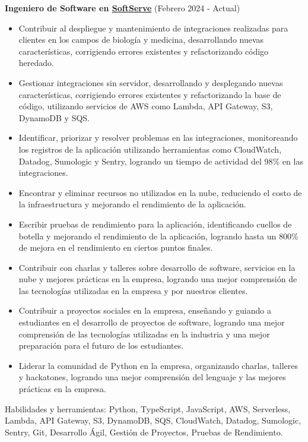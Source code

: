   \vspace*{0.2cm}
  \textbf{Ingeniero de Software en \href{https://www.softserveinc.com/en-us}{SoftServe}} (Febrero 2024 - Actual)
  \hfill
  \vspace*{0.2cm}
  \begin{minipage}{\linewidth}
    \begin{itemize}[noitemsep]
      \item Contribuir al despliegue y mantenimiento de integraciones realizadas para clientes en los campos de biología y medicina, desarrollando nuevas características, corrigiendo errores existentes y refactorizando código heredado.
      \item Gestionar integraciones sin servidor, desarrollando y desplegando nuevas características, corrigiendo errores existentes y refactorizando la base de código, utilizando servicios de AWS como Lambda, API Gateway, S3, DynamoDB y SQS.
      \item Identificar, priorizar y resolver problemas en las integraciones, monitoreando los registros de la aplicación utilizando herramientas como CloudWatch, Datadog, Sumologic y Sentry, logrando un tiempo de actividad del 98\% en las integraciones.
      \item Encontrar y eliminar recursos no utilizados en la nube, reduciendo el costo de la infraestructura y mejorando el rendimiento de la aplicación.
      \item Escribir pruebas de rendimiento para la aplicación, identificando cuellos de botella y mejorando el rendimiento de la aplicación, logrando hasta un 800\% de mejora en el rendimiento en ciertos puntos finales.
      \item Contribuir con charlas y talleres sobre desarrollo de software, servicios en la nube y mejores prácticas en la empresa, logrando una mejor comprensión de las tecnologías utilizadas en la empresa y por nuestros clientes.
      \item Contribuir a proyectos sociales en la empresa, enseñando y guiando a estudiantes en el desarrollo de proyectos de software, logrando una mejor comprensión de las tecnologías utilizadas en la industria y una mejor preparación para el futuro de los estudiantes.
      \item Liderar la comunidad de Python en la empresa, organizando charlas, talleres y hackatones, logrando una mejor comprensión del lenguaje y las mejores prácticas en la empresa.
    \end{itemize}
    \hfill
  \end{minipage}
  Habilidades y herramientas: Python, TypeScript, JavaScript, AWS, Serverless, Lambda, API Gateway, S3, DynamoDB, SQS, CloudWatch, Datadog, Sumologic, Sentry, Git, Desarrollo Ágil, Gestión de Proyectos, Pruebas de Rendimiento.

